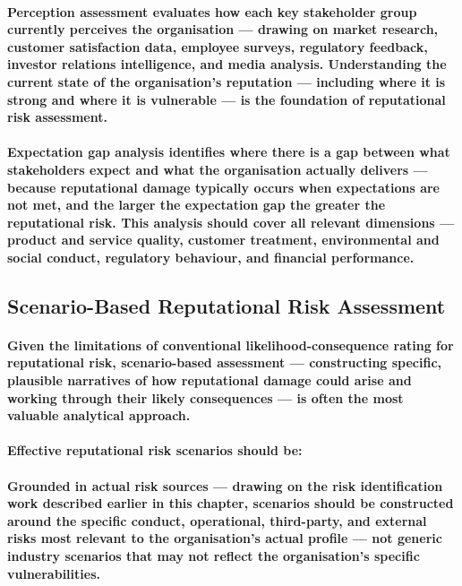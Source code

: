 \paragraph{\textbf{Perception assessment} evaluates how each key stakeholder group currently perceives the organisation — drawing on market research, customer satisfaction data, employee surveys, regulatory feedback, investor relations intelligence, and media analysis. Understanding the current state of the organisation's reputation — including where it is strong and where it is vulnerable — is the foundation of reputational risk assessment.}
\paragraph{\textbf{Expectation gap analysis} identifies where there is a gap between what stakeholders expect and what the organisation actually delivers — because reputational damage typically occurs when expectations are not met, and the larger the expectation gap the greater the reputational risk. This analysis should cover all relevant dimensions — product and service quality, customer treatment, environmental and social conduct, regulatory behaviour, and financial performance.}

\subsection{Scenario-Based Reputational Risk Assessment}
\paragraph{Given the limitations of conventional likelihood-consequence rating for reputational risk, \textbf{scenario-based assessment} — constructing specific, plausible narratives of how reputational damage could arise and working through their likely consequences — is often the most valuable analytical approach.}
\paragraph{Effective reputational risk scenarios should be:}
\paragraph{\textbf{Grounded in actual risk sources} — drawing on the risk identification work described earlier in this chapter, scenarios should be constructed around the specific conduct, operational, third-party, and external risks most relevant to the organisation's actual profile — not generic industry scenarios that may not reflect the organisation's specific vulnerabilities.}
